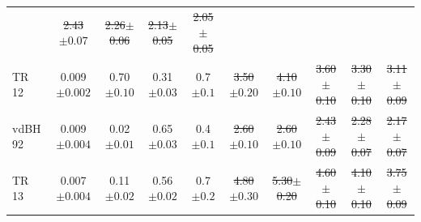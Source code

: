 \documentclass[draft]{aa}
\providecommand{\DIFaddtex}[1]{{\protect\color{blue}\uwave{#1}}} %
\providecommand{\DIFdeltex}[1]{{\protect\color{red}\sout{#1}}}                      %
\providecommand{\DIFaddFL}[1]{\DIFadd{#1}} %
\providecommand{\DIFdelFL}[1]{\DIFdel{#1}} %
\providecommand{\DIFaddbeginFL}{} %
\providecommand{\DIFaddendFL}{} %
\providecommand{\DIFdelbeginFL}{} %
\providecommand{\DIFdelendFL}{} %
\providecommand{\DIFadd}[1]{\texorpdfstring{\DIFaddtex{#1}}{#1}} %
\providecommand{\DIFdel}[1]{\texorpdfstring{\DIFdeltex{#1}}{}} %
\newcommand{\DIFscaledelfig}{0.5}
\newlength{\DIFdelgraphicswidth} %
\newlength{\DIFdelgraphicsheight} %
\newcommand{\DIFaddincludegraphics}[2][]{{\color{blue}\fbox{\DIFOincludegraphics[#1]{#2}}}} %
\newcommand{\DIFdelincludegraphics}[2][]{%
\sbox{\DIFdelgraphicsbox}{\DIFOincludegraphics[#1]{#2}}%
\settoboxwidth{\DIFdelgraphicswidth}{\DIFdelgraphicsbox} %
\settoboxtotalheight{\DIFdelgraphicsheight}{\DIFdelgraphicsbox} %
\scalebox{\DIFscaledelfig}{%
\parbox[b]{\DIFdelgraphicswidth}{\usebox{\DIFdelgraphicsbox}\\[-\baselineskip] \rule{\DIFdelgraphicswidth}{0em}}\llap{\resizebox{\DIFdelgraphicswidth}{\DIFdelgraphicsheight}{%
\setlength{\unitlength}{\DIFdelgraphicswidth}%
\begin{picture}(1,1)%
\thicklines\linethickness{2pt} %
{\color[rgb]{1,0,0}\put(0,0){\framebox(1,1){}}}%
{\color[rgb]{1,0,0}\put(0,0){\line( 1,1){1}}}%
{\color[rgb]{1,0,0}\put(0,1){\line(1,-1){1}}}%
\end{picture}%
}\hspace*{3pt}}} %
} %
\DeclareRobustCommand{\DIFaddbeginFL}{\DIFOaddbeginFL \let\includegraphics\DIFaddincludegraphics} %
\DeclareRobustCommand{\DIFaddendFL}{\DIFOaddendFL \let\includegraphics\DIFOincludegraphics} %
\DeclareRobustCommand{\DIFdelbeginFL}{\DIFOdelbeginFL \let\includegraphics\DIFdelincludegraphics} %
\DeclareRobustCommand{\DIFdelendFL}{\DIFOaddendFL \let\includegraphics\DIFOincludegraphics} %
\begin{document}
\begin{table}[ht]
\begin{tabular}{lccccccccc}
 \DIFaddbeginFL \DIFaddFL{$1.94\pm0.06$ }\DIFaddendFL & \DIFdelbeginFL \DIFdelFL{2.43$\pm0.07$ }\DIFdelendFL \DIFaddbeginFL \DIFaddFL{$2.43\pm0.07$ }\DIFaddendFL & \DIFdelbeginFL \DIFdelFL{2.26$\pm$0.06 }\DIFdelendFL \DIFaddbeginFL \DIFaddFL{$2.26\pm0.06$ }\DIFaddendFL & \DIFdelbeginFL \DIFdelFL{2.13$\pm$0.05 }\DIFdelendFL \DIFaddbeginFL \DIFaddFL{$2.13\pm0.05$ }\DIFaddendFL & \DIFdelbeginFL \DIFdelFL{2.05$\pm$0.05}\DIFdelendFL \DIFaddbeginFL \DIFaddFL{$2.05\pm0.05$}\DIFaddendFL \\
%
 TR 12 & 0.009$\pm0.002$ & 0.70$\pm0.10$ & 0.31$\pm0.03$ & 0.7$\pm0.1$ &
 \DIFdelbeginFL \DIFdelFL{3.50$\pm0.20$ }\DIFdelendFL %
 \DIFaddbeginFL \DIFaddFL{$3.50\pm0.15$ }\DIFaddendFL & \DIFdelbeginFL \DIFdelFL{4.10$\pm0.10$ }\DIFdelendFL \DIFaddbeginFL \DIFaddFL{$4.08\pm0.14$ }\DIFaddendFL & \DIFdelbeginFL \DIFdelFL{3.60$\pm$0.10 }\DIFdelendFL \DIFaddbeginFL \DIFaddFL{$3.63\pm0.13$ }\DIFaddendFL & \DIFdelbeginFL \DIFdelFL{3.30$\pm$0.10 }\DIFdelendFL \DIFaddbeginFL \DIFaddFL{$3.31\pm0.10$ }\DIFaddendFL & \DIFdelbeginFL \DIFdelFL{3.11$\pm$0.09}\DIFdelendFL \DIFaddbeginFL \DIFaddFL{$3.11\pm0.09$}\DIFaddendFL \\
 vdBH 92 & 0.009$\pm0.004$ & 0.02$\pm0.01$ & 0.65$\pm0.03$ & 0.4$\pm0.1$ &
 \DIFdelbeginFL \DIFdelFL{2.60$\pm0.10$ }\DIFdelendFL %
 \DIFaddbeginFL \DIFaddFL{$2.59\pm0.11$ }\DIFaddendFL & \DIFdelbeginFL \DIFdelFL{2.60$\pm0.10$ }\DIFdelendFL \DIFaddbeginFL \DIFaddFL{$2.61\pm0.11$ }\DIFaddendFL & \DIFdelbeginFL \DIFdelFL{2.43$\pm$0.09 }\DIFdelendFL \DIFaddbeginFL \DIFaddFL{$2.43\pm0.09$ }\DIFaddendFL & \DIFdelbeginFL \DIFdelFL{2.28$\pm$0.07 }\DIFdelendFL \DIFaddbeginFL \DIFaddFL{$2.28\pm0.07$ }\DIFaddendFL & \DIFdelbeginFL \DIFdelFL{2.17$\pm$0.07}\DIFdelendFL \DIFaddbeginFL \DIFaddFL{$2.17\pm0.07$}\DIFaddendFL \\
 TR 13 & 0.007$\pm0.004$ & 0.11$\pm0.02$ & 0.56$\pm0.02$ & 0.7$\pm0.2$ &
 \DIFdelbeginFL \DIFdelFL{4.80$\pm0.30$ }\DIFdelendFL %
 \DIFaddbeginFL \DIFaddFL{$4.81\pm0.33$ }\DIFaddendFL & \DIFdelbeginFL \DIFdelFL{5.30$\pm$0.20 }\DIFdelendFL \DIFaddbeginFL \DIFaddFL{$5.25\pm0.16$ }\DIFaddendFL & \DIFdelbeginFL \DIFdelFL{4.60$\pm$0.10 }\DIFdelendFL \DIFaddbeginFL \DIFaddFL{$4.58\pm0.14$ }\DIFaddendFL & \DIFdelbeginFL \DIFdelFL{4.10$\pm$0.10 }\DIFdelendFL \DIFaddbeginFL \DIFaddFL{$4.10\pm0.11$ }\DIFaddendFL & \DIFdelbeginFL \DIFdelFL{3.75$\pm$0.09}\DIFdelendFL \DIFaddbeginFL \DIFaddFL{$3.75\pm0.09$}\DIFaddendFL \\

\end{tabular}
\end{table}
\end{document}

